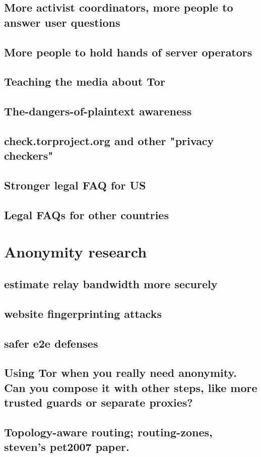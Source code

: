 \documentclass{article}
\begin{document}
\subsection{More activist coordinators, more people to answer user questions}
\subsection{More people to hold hands of server operators}
\subsection{Teaching the media about Tor}
\subsection{The-dangers-of-plaintext awareness}
\subsection{check.torproject.org and other "privacy checkers"}
\subsection{Stronger legal FAQ for US}
\subsection{Legal FAQs for other countries}
\section{Anonymity research}
\subsection{estimate relay bandwidth more securely}
\subsection{website fingerprinting attacks}
\subsection{safer e2e defenses}
\subsection{Using Tor when you really need anonymity. Can you compose it
      with other steps, like more trusted guards or separate proxies?}
\subsection{Topology-aware routing; routing-zones, steven's pet2007 paper.}
\end{document}
